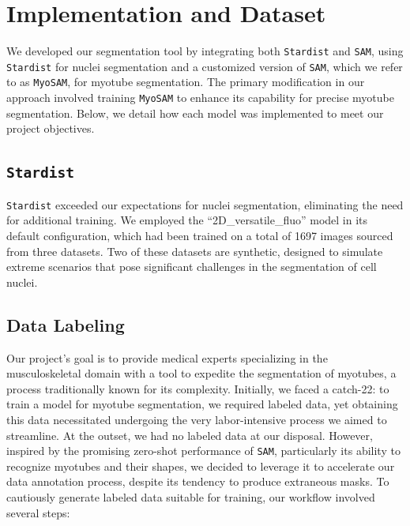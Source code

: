 \section{Implementation and Dataset}\label{secdataset}

We developed our segmentation tool by integrating both \texttt{Stardist} and \texttt{SAM}, using \texttt{Stardist} for nuclei segmentation and a customized version of \texttt{SAM}, which we refer to as \texttt{MyoSAM}, for myotube segmentation. The primary modification in our approach involved training \texttt{MyoSAM} to enhance its capability for precise myotube segmentation. Below, we detail how each model was implemented to meet our project objectives.

\subsection{\texttt{Stardist}}
\texttt{Stardist} exceeded our expectations for nuclei segmentation, eliminating the need for additional training. We employed the ``2D\_versatile\_fluo'' model in its default configuration, which had been trained on a total of 1697 images sourced from three datasets. Two of these datasets are synthetic, designed to simulate extreme scenarios that pose significant challenges in the segmentation of cell nuclei.

\subsection{Data Labeling}

Our project's goal is to provide medical experts specializing in the musculoskeletal domain with a tool to expedite the segmentation of myotubes, a process traditionally known for its complexity. Initially, we faced a catch-22: to train a model for myotube segmentation, we required labeled data, yet obtaining this data necessitated undergoing the very labor-intensive process we aimed to streamline. At the outset, we had no labeled data at our disposal. However, inspired by the promising zero-shot performance of \texttt{SAM}, particularly its ability to recognize myotubes and their shapes, we decided to leverage it to accelerate our data annotation process, despite its tendency to produce extraneous masks. To cautiously generate labeled data suitable for training, our workflow involved several steps:


